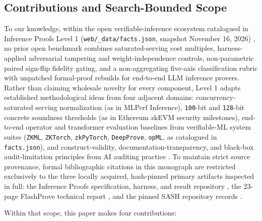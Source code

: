\documentclass[11pt,letterpaper]{article}
\begin{document}
\subsection{Contributions and Search-Bounded Scope}

To our knowledge, within the open verifiable-inference ecosystem catalogued in Inference Proofs Level 1 (\texttt{web/\allowbreak{}\_\allowbreak{}data/\allowbreak{}facts.\allowbreak{}json}, snapshot November 16, 2026) \cite{iproofs2026}, no prior open benchmark combines saturated-serving cost multiples, harness-applied adversarial tampering and weight-independence controls, non-parametric paired sign-flip fidelity gating, and a non-aggregating five-axis classification rubric with unpatched formal-proof rebuilds for end-to-end LLM inference provers. Rather than claiming wholesale novelty for every component, Level 1 adapts established methodological ideas from four adjacent domains: concurrency-saturated serving normalization (as in MLPerf Inference), \texttt{100}-bit and \texttt{128}-bit concrete soundness thresholds (as in Ethereum zkEVM security milestones), end-to-end operator and transformer evaluation baselines from verifiable-ML system suites (\texttt{ZKML}, \texttt{ZKTorch}, \texttt{zkPyTorch}, \texttt{DeepProve}, \texttt{opML}, as catalogued in \texttt{facts.\allowbreak{}json}), and construct-validity, documentation-transparency, and black-box audit-limitation principles from AI auditing practice \cite{iproofs2026}. To maintain strict source provenance, formal bibliographic citations in this monograph are restricted exclusively to the three locally acquired, hash-pinned primary artifacts inspected in full: the Inference Proofs specification, harness, and result repository \cite{iproofs2026}, the 23-page FlashProve technical report \cite{rinberg2026flashprove}, and the pinned SASH repository records \cite{sash2026}.

Within that scope, this paper makes four contributions:
\end{document}
